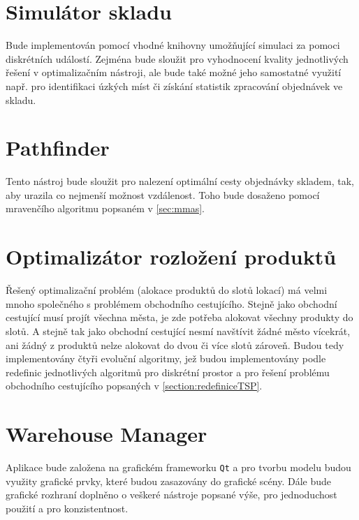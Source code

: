 \section{Simulátor skladu}
\label{navrhSimulator}
Bude implementován pomocí vhodné knihovny umožňující simulaci za pomoci diskrétních událostí. Zejména bude sloužit pro vyhodnocení kvality jednotlivých řešení v optimalizačním nástroji, ale bude také možné jeho samostatné využití např. pro identifikaci úzkých míst či získání statistik zpracování objednávek ve skladu.

\section{Pathfinder}
\label{navrhPathfinder}
Tento nástroj bude sloužit pro nalezení optimální cesty objednávky skladem, tak, aby urazila co nejmenší možnost vzdálenost. Toho bude dosaženo pomocí mravenčího algoritmu popsaném v \ref{sec:mmas}.

\section{Optimalizátor rozložení produktů}
\label{navrhOptimalizator}
Řešený optimalizační problém (alokace produktů do slotů lokací) má velmi mnoho společného s problémem obchodního cestujícího. Stejně jako obchodní cestující musí projít všechna města, je zde potřeba alokovat všechny produkty do slotů. A stejně tak jako obchodní cestující nesmí navštívit žádné město vícekrát, ani žádný z produktů nelze alokovat do dvou či více slotů zároveň. Budou tedy implementovány čtyři evoluční algoritmy, jež budou implementovány podle redefinic jednotlivých algoritmů pro diskrétní prostor a pro řešení problému obchodního cestujícího popsaných v \ref{section:redefiniceTSP}.

\section{Warehouse Manager}
\label{navrhKonfigurator}
Aplikace bude založena na grafickém frameworku \texttt{Qt} a pro tvorbu modelu budou využity grafické prvky, které budou zasazovány do grafické scény. Dále bude grafické rozhraní doplněno o veškeré nástroje popsané výše, pro jednoduchost použití a pro konzistentnost.
